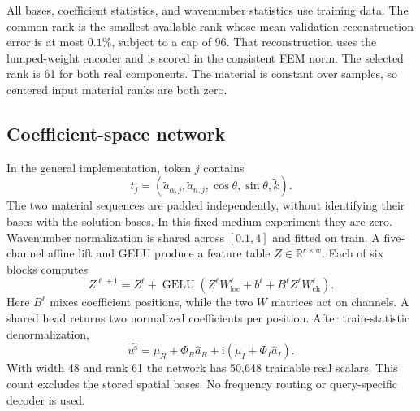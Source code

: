 \documentclass{article}
\newcommand{\ii}{\mathrm{i}}
\newcommand{\R}{\mathbb{R}}
\newcommand{\us}{u^{\mathrm{s}}}
\begin{document}
All bases, coefficient statistics, and wavenumber statistics use training data. The common rank is the smallest available rank whose mean validation reconstruction error is at most $0.1\%$, subject to a cap of 96. That reconstruction uses the lumped-weight encoder and is scored in the consistent FEM norm. The selected rank is 61 for both real components. The material is constant over samples, so centered input material ranks are both zero.

\subsection{Coefficient-space network}
In the general implementation, token $j$ contains
\begin{equation}
t_j=(\widetilde a_{\alpha,j},\widetilde a_{n,j},
\cos\theta,\sin\theta,\widetilde k).
\end{equation}
The two material sequences are padded independently, without identifying their bases with the solution bases. In this fixed-medium experiment they are zero. Wavenumber normalization is shared across $[0.1,4]$ and fitted on train. A five-channel affine lift and GELU produce a feature table $Z\in\R^{r\times w}$. Each of six blocks computes
\begin{equation}
Z^{\ell+1}=Z^\ell+\operatorname{GELU}\!\left(
Z^\ell W^\ell_{\mathrm{loc}}+b^\ell
+B^\ell Z^\ell W^\ell_{\mathrm{ch}}\right).
\label{eq:block}
\end{equation}
Here $B^\ell$ mixes coefficient positions, while the two $W$ matrices act on channels. A shared head returns two normalized coefficients per position. After train-statistic denormalization,
\begin{equation}
\widehat{\us}=\mu_R+\Phi_R\widehat a_R
+\ii(\mu_I+\Phi_I\widehat a_I).
\label{eq:decode}
\end{equation}
With width 48 and rank 61 the network has 50,648 trainable real scalars. This count excludes the stored spatial bases. No frequency routing or query-specific decoder is used.
\end{document}
